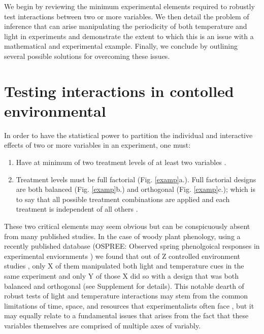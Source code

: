 \documentclass[11pt]{article}
\begin{document}
We begin by reviewing the minimum experimental elements required to robustly test interactions between two or more variables. We then detail the problem of inference that can arise manipulating the periodicity of both temperature and light in experiments and demonstrate the extent to which this is an issue with a mathematical and experimental example. Finally, we conclude by outlining several possible solutions for overcoming these issues. 

\section{Testing interactions in contolled environmental}
In order to have the statistical power to partition the individual and interactive effects of two or more variables in an experiment, one must:
\begin{enumerate}
\item Have at minimum of two treatment levels of at least two variables \citep{}.
\item Treatment levels must be full factorial (Fig. \ref{examp}a.). Full factorial designs are both balanced (Fig. \ref{examp}b.)  and orthogonal (Fig. \ref{examp}c.); which is to say that all possible treatment combinations are applied and each treatment is independent of all others \citep{}.
\end{enumerate}

These two critical elements may seem obvious but can be conspicuously absent from many published studies. In the case of woody plant phenology, using a recently published database (OSPREE: Observed spring phenolgoical responses in experimental enviornments \citep{}) we found that out of Z controlled environment studies \citep{}, only X of them manipulated both light and temperature cues in the same experiment and only Y of those X did so with a design that was both balanced and orthogonal (see Supplement for details). This notable dearth of robust tests of light and temperature interactions may stem from the common limitations of time, space, and resources that experimentalists often face \citep{}, but it may equally relate to a fundamental issues that arises from the fact that these variables themselves are comprised of multiple axes of variably.
\end{document}

